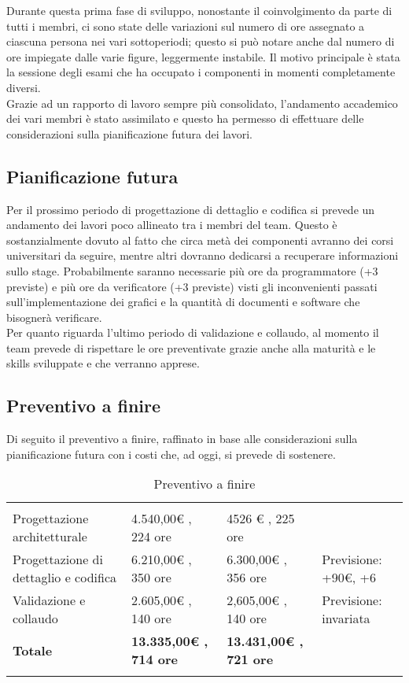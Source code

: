 Durante questa prima fase di sviluppo, nonostante il coinvolgimento da parte di tutti i membri, ci sono state delle variazioni sul numero di ore assegnato a ciascuna persona nei vari sottoperiodi; questo si può notare anche dal numero di ore impiegate dalle varie figure, leggermente instabile. Il motivo principale è stata la sessione degli esami che ha occupato i componenti in momenti completamente diversi.\\ Grazie ad un rapporto di lavoro sempre più consolidato, l'andamento accademico dei vari membri è stato assimilato e questo ha permesso di effettuare delle considerazioni sulla pianificazione futura dei lavori.

\subsection{Pianificazione futura}

Per il prossimo periodo di progettazione di dettaglio e codifica si prevede un andamento dei lavori poco allineato tra i membri del team. Questo è sostanzialmente dovuto al fatto che circa metà dei componenti avranno dei corsi universitari da seguire, mentre altri dovranno dedicarsi a recuperare informazioni sullo stage. Probabilmente saranno necessarie più ore da programmatore (+3 previste) e più ore da verificatore (+3 previste) visti gli inconvenienti passati sull'implementazione dei grafici e la quantità di documenti e software che bisognerà verificare. \\ Per quanto riguarda l'ultimo periodo di validazione e collaudo, al momento il team prevede di rispettare le ore preventivate grazie anche alla maturità e le skills sviluppate e che verranno apprese.

\subsection{Preventivo a finire}
Di seguito il preventivo a finire, raffinato in base alle considerazioni sulla pianificazione futura con i costi che, ad oggi, si prevede di sostenere.
{
\setlength\arrayrulewidth{1pt}
\begin{longtable}{ C{3.5cm} | C{5cm} | C{5cm} | C{2cm}} 
 	 &
 	 &
 	 & 
 	 \\
 	
 	Progettazione architetturale & 4.540,00€ , 224 ore & 4526 € , 225 ore & \begin{LARGE}\redcheck \end{LARGE}\\
 	Progettazione di dettaglio e codifica & 6.210,00€ , 350 ore & 6.300,00€ , 356 ore & Previsione: +90€, +6\\
 	Validazione e collaudo & 2.605,00€ , 140 ore  & 2,605,00€ , 140 ore   & Previsione: invariata\\
 	\textbf{Totale} & \textbf{13.335,00€ , 714 ore} & \textbf{13.431,00€ , 721 ore} &  \\
 	
 	\caption{Preventivo a finire}
\end{longtable}
}

\newpage